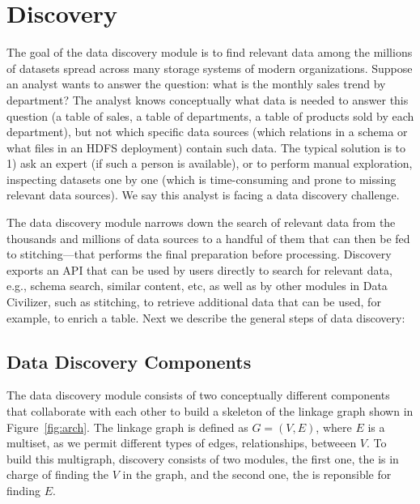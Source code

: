 \section{Discovery}
\label{sec:discovery}

The goal of the data discovery module is to find relevant data among the
millions of datasets spread across many storage systems of modern organizations.
Suppose an analyst wants to answer the question: what is the monthly sales trend
by department? The analyst knows conceptually what data is needed to answer this
question (a table of sales, a table of departments, a table of products sold by
each department), but not which specific data sources (which relations in a
schema or what files in an HDFS deployment) contain such data. The typical
solution is to 1) ask an expert (if such a person is available), or to perform
manual exploration, inspecting datasets one by one (which is time-consuming and
prone to missing relevant data sources). We say this analyst is facing a data
discovery challenge.

The data discovery module narrows down the search of relevant data from the
thousands and millions of data sources to a handful of them that can then be fed
to stitching---that performs the final preparation before processing. Discovery
exports an API that can be used by users directly to search for relevant data,
e.g., schema search, similar content, etc, as well as by other modules in Data
Civilizer, such as stitching, to retrieve additional data that can be used, for
example, to enrich a table. Next we describe the general steps of data
discovery:

\subsection{Data Discovery Components}

The data discovery module consists of two conceptually different components that
collaborate with each other to build a skeleton of the linkage graph shown in
Figure~\ref{fig:arch}. The linkage graph is defined as $G=(V,E)$, where $E$ is a
multiset, as we permit different types of edges, \ie relationships, betweeen
$V$. To build this multigraph, discovery consists of two modules, the first one,
the  is in charge of finding the $V$ in the graph, and the
second one, the  is reponsible for finding $E$.

